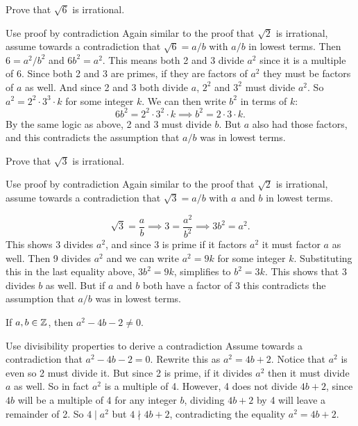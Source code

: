 \documentclass{article}
\begin{document}
\begin{problem}
    Prove that $\sqrt{6}$ is irrational.
\end{problem}
\begin{solution}{Use proof by contradiction}
    Again similar to the proof that $\sqrt{2}$ is irrational, assume towards a contradiction that $\sqrt{6} = a/b$ with $a/b$ in lowest terms. Then $6 = a^2/b^2$ and $6b^2 = a^2$. This means both 2 and 3 divide $a^2$ since it is a multiple of 6. Since both 2 and 3 are primes, if they are factors of $a^2$ they must be factors of $a$ as well. And since 2 and 3 both divide $a$, $2^2$ and $3^2$ must divide $a^2$. So $a^2 = 2^2 \cdot 3^3 \cdot k$ for some integer $k$. We can then write $b^2$ in terms of $k$:
    $$6b^2 = 2^2 \cdot 3^2 \cdot k \implies b^2 = 2\cdot 3 \cdot k.$$
    By the same logic as above, 2 and 3 must divide $b$. But $a$ also had those factors, and this contradicts the assumption that $a/b$ was in lowest terms.
\end{solution}

\begin{problem}
    Prove that $\sqrt{3}$ is irrational.
\end{problem}
\begin{solution}{Use proof by contradiction}
    Again similar to the proof that $\sqrt{2}$ is irrational, assume towards a contradiction that $\sqrt{3} = a/b$ with $a$ and $b$ in lowest terms. 

    $$\sqrt{3} = \frac{a}{b} \implies 3 = \frac{a^2}{b^2} \implies 3b^2 = a^2.$$
    This shows 3 divides $a^2$, and since 3 is prime if it factors $a^2$ it must factor $a$ as well. Then 9 divides $a^2$ and we can write $a^2 = 9k$ for some integer $k$. Substituting this in the last equality above, $3b^2 = 9k$, simplifies to $b^2 = 3k$. This shows that 3 divides $b$ as well. But if $a$ and $b$ both have a factor of 3 this contradicts the assumption that $a/b$ was in lowest terms.

\end{solution}

\begin{problem}
    If $a, b \in\mathbb{Z}$, then $a^2 - 4b - 2 \neq 0$.
\end{problem}
\begin{solution}{Use divisibility properties to derive a contradiction}
   Assume towards a contradiction that $a^2 - 4b -2 = 0$. Rewrite this as $a^2 = 4b + 2$. Notice that $a^2$ is even so 2 must divide it. But since 2 is prime, if it divides $a^2$ then it must divide $a$ as well. So in fact $a^2$ is a multiple of 4. However, 4 does not divide $4b + 2$, since $4b$ will be a multiple of 4 for any integer $b$, dividing $4b + 2$ by 4 will leave a remainder of 2. So $4 \mid a^2$ but $4 \nmid 4b + 2$, contradicting the equality $a^2 = 4b + 2$.
\end{solution}
\end{document}
